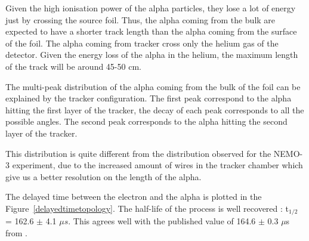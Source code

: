 \documentclass[main.tex]{subfiles}
\begin{document}
\FloatBarrier


\noindent Given the high ionisation power of the alpha particles, they lose a lot of energy just by crossing the source foil. Thus, the alpha coming from the bulk are expected to have a shorter track length than the alpha coming from the surface of the foil. The alpha coming from tracker cross only the helium gas of the detector. Given the energy loss of the alpha in the helium, the maximum length of the track will be around 45-50 cm.

\bigskip

\noindent The multi-peak distribution of the alpha coming from the bulk of the foil can be explained by the tracker configuration. The first peak correspond to the alpha hitting the first layer of the tracker, the decay of each peak corresponds to all the possible angles. The second peak corresponds to the alpha hitting the second layer of the tracker.



\noindent This distribution is quite different from the distribution observed for the NEMO-3 experiment, due to the increased amount of wires in the tracker chamber which give us a better resolution on the length of the alpha. 


\bigskip


\noindent The delayed time between the electron and the alpha is plotted in the Figure~\ref{delayedtimetopology}. The half-life of the process is well recovered : t$_{\text{1/2}}$ = 162.6 $\pm$ 4.1 $\mu s$. This agrees well with the published value of 164.6 $\pm$ 0.3 $\mu$s from \cite{NuclearDataSheet210}.
\end{document}
